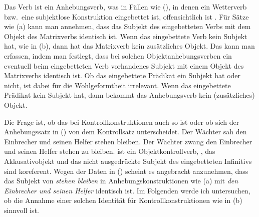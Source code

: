 Das Verb  ist ein Anhebungsverb, was in Fällen wie
(), in denen ein Wetterverb bzw.\ eine subjektlose Konstruktion eingebettet
ist, offensichtlich ist \parencites[]{Reis76c}[]{Hoehle78a}.
\eal
{}
\zl
%
Für Sätze wie (a) kann man annehmen, dass das Subjekt des eingebetteten Verbs
mit dem Objekt des Matrixverbs identisch ist. Wenn das eingebettete Verb
kein Subjekt hat, wie in (b), dann hat das Matrixverb kein zusätzliches Objekt.
Das kann man erfassen, indem man festlegt, dass bei solchen Objektanhebungsverben ein eventuell beim
eingebetteten Verb vorhandenes Subjekt mit einem Objekt des Matrixverbs identisch ist.
Ob das eingebettete Prädikat ein Subjekt hat oder nicht, ist dabei für die Wohlgeformtheit irrelevant.
Wenn das eingebettete Prädikat kein Subjekt hat, dann bekommt das Anhebungsverb kein
(zusätzliches) Objekt.

Die Frage ist, ob das bei Kontrollkonstruktionen auch so ist oder ob sich der Anhebungssatz in
() von dem Kontrollsatz unterscheidet.
\eal
\ex{}
Der Wächter sah den Einbrecher   und seinen Helfer stehen bleiben.
\ex{}
Der Wächter zwang den Einbrecher und seinen Helfer stehen zu bleiben.
\zl
{} ist ein Objektkontrollverb, \dash, das Akkusativobjekt und das
nicht ausgedrückte Subjekt des eingebetteten Infinitivs sind koreferent.
Wegen der Daten in () scheint es angebracht anzunehmen, dass das Subjekt
von \emph{stehen bleiben} in Anhebungskonstruktionen wie (a)
mit \emph{den Einbrecher und seinen Helfer} identisch ist.
Im Folgenden werde ich untersuchen, ob die Annahme einer solchen Identität für
Kontrollkonstruktionen wie in (b) sinnvoll ist.

